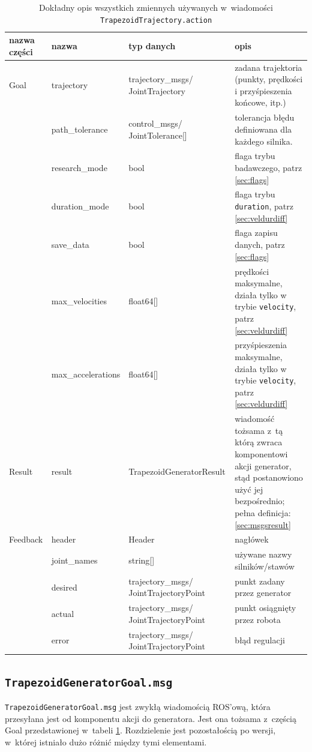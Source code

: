 \documentclass[a4paper, 12pt]{article}
\begin{document}
	\begin{table}[H]
	\label{tab:actionparams}
	\centering
	\begin{tabular}{|m{4em}|m{8em}|m{12em}|m{13em}|}
	\hline
	nazwa części & nazwa & typ danych & opis\\
	\hline
	\hline
	Goal & trajectory & trajectory\_msgs/ JointTrajectory & zadana trajektoria (punkty, prędkości i przyśpieszenia końcowe, itp.) \\  
	\cline{2-4}
	& path\_tolerance & control\_msgs/ JointTolerance[]&tolerancja błędu definiowana dla każdego silnika.\\
	\cline{2-4}
	& research\_mode & bool & flaga trybu badawczego, patrz \ref{sec:flags}\\
	\cline{2-4}
	& duration\_mode & bool & flaga trybu \texttt{duration}, patrz \ref{sec:veldurdiff}\\
	\cline{2-4}
	& save\_data & bool & flaga zapisu danych, patrz \ref{sec:flags}\\
	\cline{2-4}
	& max\_velocities & float64[] & prędkości maksymalne, działa tylko w trybie \texttt{velocity}, patrz \ref{sec:veldurdiff}\\
	\cline{2-4}
	& max\_accelerations & float64[] & przyśpieszenia maksymalne, działa tylko w trybie \texttt{velocity}, patrz \ref{sec:veldurdiff}\\
	\hline
	Result & result & TrapezoidGeneratorResult & wiadomość tożsama z~tą którą zwraca komponentowi akcji generator, stąd postanowiono użyć jej bezpośrednio; pełna definicja: \ref{sec:msgsresult}\\
	\hline
	Feedback & header & Header & nagłówek\\
	\cline{2-4}
	& joint\_names & string[] & używane nazwy silników/stawów\\
	\cline{2-4}
	& desired & trajectory\_msgs/ JointTrajectoryPoint & punkt zadany przez generator\\
	\cline{2-4}
	& actual & trajectory\_msgs/ JointTrajectoryPoint & punkt osiągnięty przez robota\\
	\cline{2-4}
	& error & trajectory\_msgs/ JointTrajectoryPoint & błąd regulacji\\
	\hline
	\end{tabular}
	\caption{Dokładny opis wszystkich zmiennych używanych w~wiadomości \texttt{TrapezoidTrajectory.action}}
	\end{table}
	
	\subsection{\texttt{TrapezoidGeneratorGoal.msg}}
	\label{sec:msgsgoal}
	\texttt{TrapezoidGeneratorGoal.msg} jest zwykłą wiadomością ROS'ową, która przesyłana jest od komponentu akcji do generatora. Jest ona tożsama z~częścią Goal przedstawionej w~tabeli \ref{tab:actionparams}. Rozdzielenie jest pozostałością po wersji, w~której istniało dużo różnić między tymi elementami. 
\end{document}
